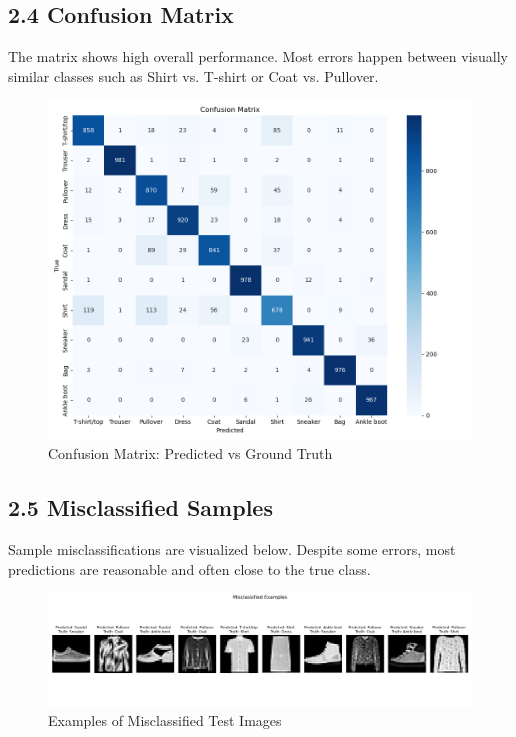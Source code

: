 \documentclass[12pt]{article}
\begin{document}
\subsection*{2.4 Confusion Matrix}

The matrix shows high overall performance. Most errors happen between visually similar classes such as Shirt vs. T-shirt or Coat vs. Pullover.

\begin{figure}[H]
    \centering
    \includegraphics[width=0.9\linewidth]{Figure_1.png}
    \caption{Confusion Matrix: Predicted vs Ground Truth}
\end{figure}

\subsection*{2.5 Misclassified Samples}

Sample misclassifications are visualized below. Despite some errors, most predictions are reasonable and often close to the true class.

\begin{figure}[H]
    \centering
    \includegraphics[width=0.9\linewidth]{Figure_2.png}
    \caption{Examples of Misclassified Test Images}
\end{figure}
\end{document}
